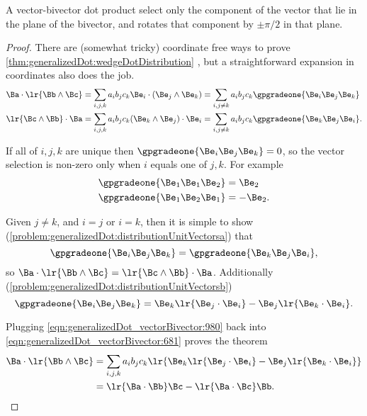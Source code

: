 A vector-bivector dot product select only the component of the vector that lie in the plane of the bivector, and rotates that component by \( \pm \pi/2 \) in that plane.
\begin{proof}
There are (somewhat tricky) coordinate free ways to prove
\cref{thm:generalizedDot:wedgeDotDistribution}
, but a straightforward expansion in coordinates also does the job.
\begin{equation}\label{eqn:generalizedDot_vectorBivector:681}
\begin{aligned}
\Ba \cdot \lr{ \Bb \wedge \Bc } &= \sum_{i, j, k} a_i b_j c_k \Be_i \cdot (\Be_j \wedge \Be_k)
= \sum_{i, j \ne k} a_i b_j c_k \gpgradeone{ \Be_i \Be_j \Be_k }
\\
\lr{ \Bc \wedge \Bb } \cdot \Ba &= \sum_{i, j, k} a_i b_j c_k (\Be_k \wedge \Be_j) \cdot \Be_i
= \sum_{i, j \ne k} a_i b_j c_k \gpgradeone{ \Be_k \Be_j \Be_i }.
\end{aligned}
\end{equation}

If all of \( i, j, k \) are unique then \( \gpgradeone{ \Be_i \Be_j \Be_k } = 0 \), so the vector selection is non-zero only when \( i \) equals one of \( j, k \).
For example
\begin{equation}\label{eqn:generalizedDot_vectorBivector:1040}
\begin{aligned}
\gpgradeone{ \Be_1 \Be_1 \Be_2 } &= \Be_2 \\
\gpgradeone{ \Be_1 \Be_2 \Be_1 } &= -\Be_2.
\end{aligned}
\end{equation}

Given \( j \ne k \), and \( i = j \) or \( i = k \),  then it is simple to show
(\cref{problem:generalizedDot:distributionUnitVectorsa})
that
\begin{equation}\label{eqn:generalizedDot_vectorBivector:1020}
\gpgradeone{ \Be_i \Be_j \Be_k }
= \gpgradeone{ \Be_k \Be_j \Be_i },
\end{equation}
so \( \Ba \cdot \lr{ \Bb \wedge \Bc } = \lr{ \Bc \wedge \Bb } \cdot \Ba \).
Additionally
(\cref{problem:generalizedDot:distributionUnitVectorsb})
\begin{equation}\label{eqn:generalizedDot_vectorBivector:980}
\gpgradeone{ \Be_i \Be_j \Be_k }
=
\Be_k \lr{ \Be_j \cdot \Be_i }
-\Be_j \lr{ \Be_k \cdot \Be_i }.
\end{equation}

Plugging \cref{eqn:generalizedDot_vectorBivector:980} back into \cref{eqn:generalizedDot_vectorBivector:681} proves the theorem
\begin{equation}\label{eqn:generalizedDot_vectorBivector:1060}
\begin{aligned}
\Ba \cdot \lr{ \Bb \wedge \Bc }
&= \sum_{i, j, k} a_i b_j c_k \lr{ \Be_k \lr{ \Be_j \cdot \Be_i } -\Be_j \lr{ \Be_k \cdot \Be_i } } \\
&= \lr{ \Ba \cdot \Bb } \Bc - \lr{ \Ba \cdot \Bc } \Bb.
\end{aligned}
\end{equation}
\end{proof}


